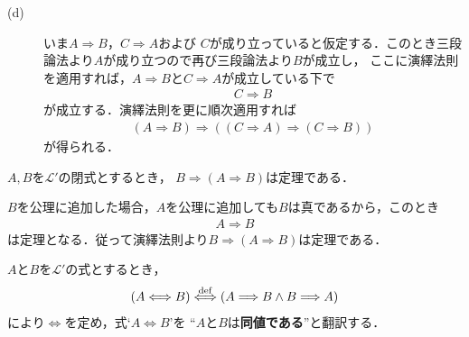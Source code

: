 \begin{prf}
\begin{description}
			\item[(d)]
				いま$A \Longrightarrow B$，$C \Longrightarrow A$および
				$C$が成り立っていると仮定する．このとき三段論法より$A$が成り立つので再び三段論法より$B$が成立し，
				ここに演繹法則を適用すれば，$A \Longrightarrow B$と$C \Longrightarrow A$が成立している下で
				\begin{align}
					C \Longrightarrow B
				\end{align}
				が成立する．演繹法則を更に順次適用すれば
				\begin{align}
					(A \Longrightarrow B) \Longrightarrow ( (C \Longrightarrow A) \Longrightarrow (C \Longrightarrow B) )
				\end{align}
				が得られる．
				\QED
		\end{description}
	\end{prf}
	
	\begin{screen}
		\begin{metathm}[正しい式は仮定を選ばない]\label{metathm:rule_of_inference_2}
			$A,B$を$\mathcal{L}'$の閉式とするとき，
			$B \Longrightarrow (A \Longrightarrow B)$は定理である．
		\end{metathm}
	\end{screen}
	
	\begin{prf}
		$B$を公理に追加した場合，$A$を公理に追加しても$B$は真であるから，このとき
		\begin{align}
			A \Longrightarrow B
		\end{align}
		は定理となる．従って演繹法則より$B \Longrightarrow (A \Longrightarrow B)$は定理である．
		\QED
	\end{prf}
	
	$A$と$B$を$\mathcal{L}'$の式とするとき，
	\begin{align}
		(A \Longleftrightarrow B) \overset{\mathrm{def}}{\Longleftrightarrow}
		(A \Longrightarrow B \wedge B \Longrightarrow A)
	\end{align}
	により$\Longleftrightarrow$を定め，式`$A \Longleftrightarrow B$'を
	``$A$と$B$は{\bf 同値である}''と翻訳する．
	

